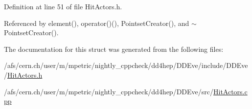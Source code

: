 Definition at line 51 of file HitActors.h.

Referenced by element(), operator()(), PointsetCreator(), and $\sim$PointsetCreator().

The documentation for this struct was generated from the following files:\begin{DoxyCompactItemize}
\item 
/afs/cern.ch/user/m/mpetric/nightly\_\-cppcheck/dd4hep/DDEve/include/DDEve/\hyperlink{_hit_actors_8h}{HitActors.h}\item 
/afs/cern.ch/user/m/mpetric/nightly\_\-cppcheck/dd4hep/DDEve/src/\hyperlink{_hit_actors_8cpp}{HitActors.cpp}\end{DoxyCompactItemize}
